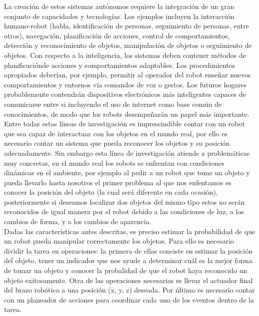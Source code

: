 \documentclass[a4paper, openright, 12pt]{report}
\begin{document}
		La creación de estos sistemas autónomos requiere la integración de un gran conjunto de capacidades y tecnologías. Los ejemplos incluyen la interacción humano-robot (habla, identificación de personas, seguimiento de personas, entre otros), navegación, planificación de acciones, control de comportamientos, detección y reconocimiento de objetos, manipulación de objetos o seguimiento de objetos. Con respecto a la inteligencia, los sistemas deben contener métodos de planificaciónde acciones y comportamientos adaptables. Los procedimientos apropiados deberían, por ejemplo, permitir al operador del robot enseñar nuevos comportamientos y entornos vía comandos de voz o gestos. Los futuros hogares probablemente contendrán dispositivos electrónicos más inteligentes capaces de comunicarse entre si incluyendo el uso de internet como base común de conocimientos, de modo que los robots desempeñarán un papel más importante.\\

		Entre todas estas líneas de investigación es imprescindible contar con un robot que sea capaz de interactuar con los objetos en el mundo real, por ello es necesario contar un sistema que pueda reconocer los objetos y su posición adecuadamente. Sin embargo esta línea de investigación atiende a problemáticas muy concretas, en el mundo real  los robots se enfrentan con condiciones dinámicas en el ambiente, por ejemplo al pedir a un robot que tome un objeto y pueda llevarlo hasta nosotros el primer problema al que nos enfentamos es conocer la posición del objeto (la cual será diferente en cada ocasión), posteriormente si deseamos localizar dos objetos del mismo tipo estos no serán reconocidos de igual manera por el robot debido a las condiciones de luz, a los cambios de forma, y a los cambios de aparencia.\\


		Dadas las características antes descritas, es preciso estimar la probabilidad de que un robot pueda manipular correctamente los objetos. Para ello es necesario dividir la tarea en operaciones: la primera de ellas conciste en estimar la posición del objeto, tener un indicador que nos ayude a determinar cuál es la mejor forma de tomar un objeto y conocer la probalidad de que el robot haya reconocido un objeto exitosamente. Otra de las operaciones necesarias es llevar el actuador final del brazo robótico a una posición (x, y, z) deseada. Por último es necesario contar con un planeador de acciones para coordinar cada uno de los eventos dentro de la tarea.\\
\end{document}
